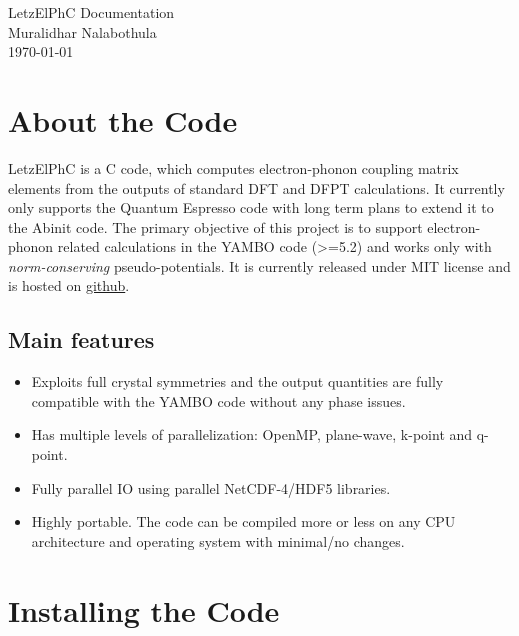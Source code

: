 \documentclass[12pt,twoside,openany]{book}
\renewcommand{\sectionmark}[1]{\markright{\thesection\ #1}}
\newcommand{\prefrontmatter}{\thispagestyle{empty}
   \begin{center}
        \huge\projecttitle\\
        \vspace{10pt}
        \large{\projectauthor}\\
        \vspace{10pt}
        \small{\projectmonth}\\
   \end{center}
    \clearpage
   \thispagestyle{empty}
}
\def\projectauthor{Muralidhar Nalabothula}
\def\projecttitle{LetzElPhC Documentation}
\def\projectmonth{\today}
\begin{document}
\prefrontmatter
{}
\renewcommand{\sectionmark}[1]{\markright{#1}}
\addtolength{\parskip}{-\baselineskip}  
\tableofcontents
\addtolength{\parskip}{\baselineskip}
\renewcommand{\sectionmark}[1]{\markright{\thesection\ #1}}
\clearpage
%
%
%
%
%
%
%
%
%
%
%
\chapter{About the Code}
LetzElPhC is a C code, which computes electron-phonon coupling matrix elements from the outputs of standard DFT and DFPT calculations. It currently only supports the Quantum Espresso code with long term plans to extend it to the Abinit code. The primary objective of this project is to support electron-phonon related calculations in the YAMBO code (>=5.2)  and works only with \emph{norm-conserving} pseudo-potentials. It is currently released under MIT license and is hosted on \href{https://github.com/muralidhar-nalabothula/LetzElPhC}{github}.
%
\section{Main features}
\begin{itemize}
    \item Exploits full crystal symmetries and the output quantities are fully compatible with the YAMBO code without any phase issues.
    \item Has multiple levels of parallelization: OpenMP, plane-wave, k-point and q-point.
    \item Fully parallel IO using parallel NetCDF-4/HDF5 libraries.
    \item Highly portable. The code can be compiled more or less on any CPU architecture and operating system with minimal/no changes.
    
\end{itemize}


\chapter{Installing the Code}
\end{document}
